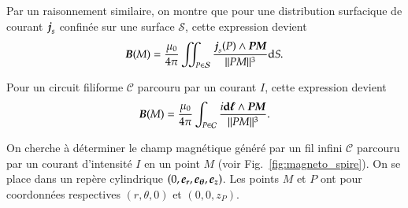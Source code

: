 	Par un raisonnement similaire, on montre que pour une distribution 
	surfacique de courant $\vecj_s$ confinée sur une 
	surface $\mathcal{S}$, cette expression devient
	\begin{equation}
		\vecb(M) = \dfrac{\mu_0}{4 \pi} \iint_{P \in \mathcal{S}} 
		\dfrac{\vecj_s(P) \wedge \mitbf{PM}}{||PM||^3} \mathrm{d}S.
	\end{equation}

	Pour un circuit filiforme $\mathcal{C}$ parcouru par un courant $I$, 
	cette expression devient
	\begin{equation}
		\vecb(M) = \dfrac{\mu_0}{4 \pi} \int_{P \in \mathcal{C}} 
	\dfrac{i \dl \wedge \mitbf{PM}}{||PM||^3}.
	\end{equation}

\begin{exemple}
	On cherche à déterminer le champ magnétique généré par un fil infini $\mathcal{C}$
	parcouru
	par un courant d'intensité $I$ en un point $M$ 
	(voir Fig.~\ref{fig:magneto_spire}). On se place dans un repère cylindrique
	$(0, \er, \etheta, \ez)$. Les points $M$ et $P$ ont pour coordonnées 
	respectives $(r, \theta, 0)$ et $(0, 0, z_P)$.


\end{exemple}
